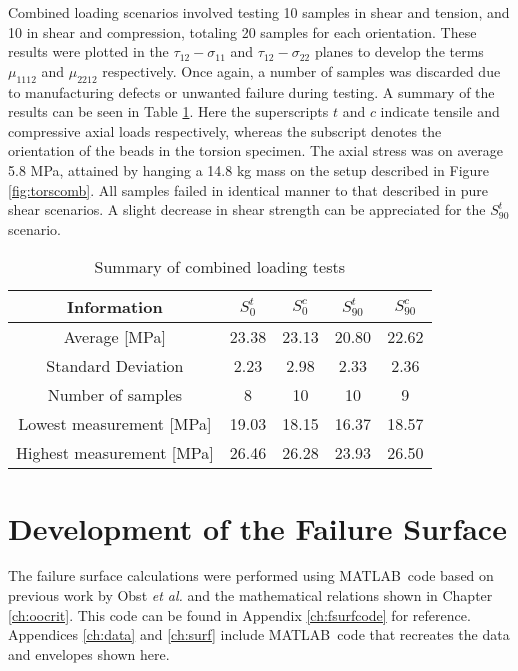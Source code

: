 \documentclass[main.tex]{subfiles}
\begin{document}
Combined loading scenarios involved testing 10 samples in shear and tension, and 10 in shear and compression, totaling 20 samples for each orientation. These results were plotted in the $\tau_{12}-\sigma_{11}$ and $\tau_{12}-\sigma_{22}$ planes to develop the terms $\mu_{1112}$ and $\mu_{2212}$ respectively. Once again, a number of samples was discarded due to manufacturing defects or unwanted failure during testing. A summary of the results can be seen in Table \ref{tab:combl}. Here the superscripts $t$ and $c$ indicate tensile and compressive axial loads respectively, whereas the subscript denotes the orientation of the beads in the torsion specimen. The axial stress was on average 5.8 MPa, attained by hanging a 14.8 kg mass on the setup described in Figure \ref{fig:torscomb}. All samples failed in identical manner to that described in pure shear scenarios. A slight decrease in shear strength can be appreciated for the $S_{90}^t$ scenario.
 
\begin{table} [h]
	\centering
	\caption{Summary of combined loading tests}
	\begin{tabular}{ c| c c c c} 
		\toprule
		\textbf{Information} & $S_{0}^t$ &$S_{0}^c$ & $S_{90}^t$& $S_{90}^c$\\
		\midrule
		Average [MPa] &23.38 &23.13 &20.80 &22.62\\
		Standard Deviation &2.23 &2.98 &2.33 &2.36\\
		Number of samples &8 &10 &10 &9\\
		Lowest measurement [MPa] &19.03 &18.15 &16.37 &18.57\\
		Highest measurement [MPa] &26.46 &26.28 &23.93 &26.50\\
		\bottomrule
	\end{tabular}
	\label{tab:combl}
\end{table}
 
\section{Development of the Failure Surface} \label{sec:fsc}

The failure surface calculations were performed using MATLAB\textregistered~code based on previous work by Obst \emph{et al.} \cite{Obst2018} and the mathematical relations shown in Chapter \ref{ch:oocrit}. This code can be found in Appendix \ref{ch:fsurfcode} for reference. Appendices \ref{ch:data} and \ref{ch:surf} include MATLAB\textregistered~code that recreates the data and envelopes shown here.  
\end{document}
